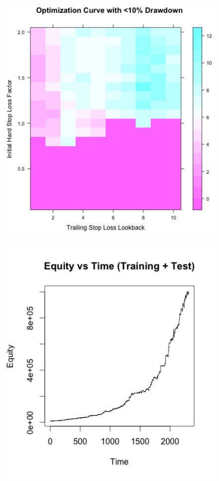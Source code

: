 \documentclass[12pt]{article}
\theoremstyle{definition}
\begin{document}
\begin{figure}[ht]
\centering
\begin{minipage}{0.45\textwidth}
  \centering
  \includegraphics[width=1\textwidth]{opt2}
  \label{fig:test12}
\end{minipage}
\begin{minipage}{0.45\textwidth}
  \centering
  \includegraphics[width=1\textwidth]{opt2_eq}
  \label{fig:test13}
\end{minipage}
\end{figure}\\
\end{document}
